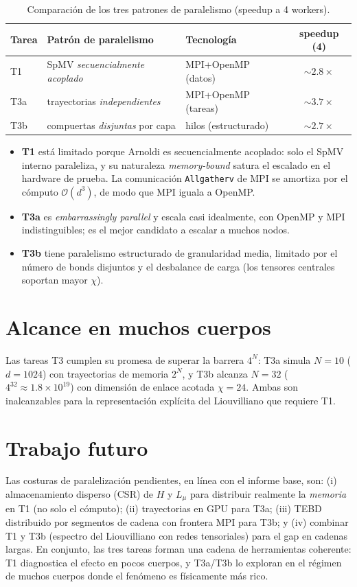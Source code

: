 \begin{table}[h]
\centering
\caption{Comparación de los tres patrones de paralelismo (speedup a 4 workers).}
\label{tab:resumen}
\begin{tabular}{lll c}
\toprule
Tarea & Patrón de paralelismo & Tecnología & speedup (4) \\
\midrule
T1  & SpMV \emph{secuencialmente acoplado} & MPI+OpenMP (datos) & $\sim2.8\times$ \\
T3a & trayectorias \emph{independientes}   & MPI+OpenMP (tareas) & $\sim3.7\times$ \\
T3b & compuertas \emph{disjuntas} por capa & hilos (estructurado) & $\sim2.7\times$ \\
\bottomrule
\end{tabular}
\end{table}

\begin{itemize}
  \item \textbf{T1} está limitado porque Arnoldi es secuencialmente acoplado: solo
  el SpMV interno paraleliza, y su naturaleza \emph{memory-bound} satura el
  escalado en el hardware de prueba. La comunicación \texttt{Allgatherv} de MPI se
  amortiza por el cómputo $\mathcal{O}(d^3)$, de modo que MPI iguala a OpenMP.
  \item \textbf{T3a} es \emph{embarrassingly parallel} y escala casi idealmente,
  con OpenMP y MPI indistinguibles; es el mejor candidato a escalar a muchos nodos.
  \item \textbf{T3b} tiene paralelismo estructurado de granularidad media,
  limitado por el número de bonds disjuntos y el desbalance de carga (los tensores
  centrales soportan mayor $\chi$).
\end{itemize}

\section*{Alcance en muchos cuerpos}

Las tareas T3 cumplen su promesa de superar la barrera $4^N$: T3a simula $N=10$
($d=1024$) con trayectorias de memoria $2^N$, y T3b alcanza $N=32$
($4^{32}\approx1.8\times10^{19}$) con dimensión de enlace acotada $\chi=24$. Ambas
son inalcanzables para la representación explícita del Liouvilliano que requiere T1.

\section*{Trabajo futuro}

Las costuras de paralelización pendientes, en línea con el informe base, son:
(i) almacenamiento disperso (CSR) de $H$ y $L_\mu$ para distribuir realmente la
\emph{memoria} en T1 (no solo el cómputo); (ii) trayectorias en GPU para T3a;
(iii) TEBD distribuido por segmentos de cadena con frontera MPI para T3b; y (iv)
combinar T1 y T3b (espectro del Liouvilliano con redes tensoriales) para el gap en
cadenas largas. En conjunto, las tres tareas forman una cadena de herramientas
coherente: T1 diagnostica el efecto en pocos cuerpos, y T3a/T3b lo exploran en el
régimen de muchos cuerpos donde el fenómeno es físicamente más rico.
